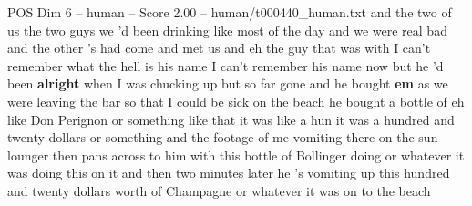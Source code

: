 \begin{textsample}{POS Dim 6 – human – Score 2.00 – human/t000440\_human.txt}  \label{ex:f6_pos_005}
and the two of us the two guys we 'd been drinking like most of the day and we were real bad and the other 's had come and met us and eh the guy that was with I can't remember what the hell is his name I can't remember his name now but he 'd been \textbf{alright} when I was chucking up but so far gone and he bought \textbf{em} as we were leaving the bar so that I could be sick on the beach he bought a bottle of eh like Don Perignon or something like that it was like a hun it was a hundred and twenty dollars or something and the footage of me vomiting there on the sun lounger then pans across to him with this bottle of Bollinger doing or whatever it was doing this on it and then two minutes later he 's vomiting up this hundred and twenty dollars worth of Champagne or whatever it was on to the beach

\end{textsample}
